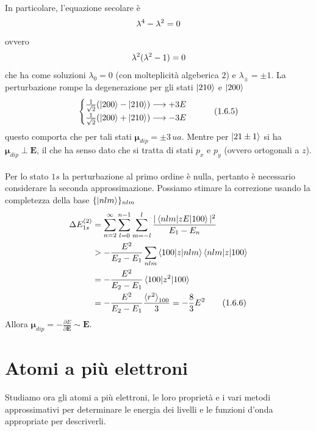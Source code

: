 \documentclass{article}
\begin{document}
In particolare, l'equazione secolare è
\begin{align}
    \lambda^4 - \lambda^2 = 0 \notag
\end{align}
ovvero 
\begin{align}
    \lambda^2(\lambda^2 - 1) = 0 \notag
\end{align}
che ha come soluzioni $\lambda_0 = 0$ (con molteplicità algeberica $2$) e $\lambda_{\pm} = \pm 1$. La perturbazione rompe la degenerazione per gli stati $\ket{210}$ e $\ket{200}$
\begin{align}
    \begin{cases}
        \frac{1}{\sqrt{2}}(\ket{200} - \ket{210}) \longrightarrow +3E \\
        \frac{1}{\sqrt{2}}(\ket{200} + \ket{210}) \longrightarrow -3E 
    \end{cases} \tag{1.6.5}
\end{align}
questo comporta che per tali stati $\boldsymbol{\mu}_{dip} = \pm 3 \, ua$. Mentre per $\ket{21\pm1}$ si ha $\boldsymbol{\mu}_{dip} \perp \mathbf{E}$, il che ha senso dato che si tratta di stati $p_x$ e $p_y$ (ovvero ortogonali a $z$). \\ \\
Per lo stato $1s$ la perturbazione al primo ordine è nulla, pertanto è necessario considerare la seconda approssimazione. Possiamo stimare la correzione usando la completezza della base $\{\ket{nlm}\}_{nlm}$
\begin{align}
    \Delta E^{(2)}_{1s} &= \sum_{n = 2}^\infty \sum_{l = 0}^{n - 1}\sum_{m = -l}^l \frac{|\braket{nlm|zE|100}|^2}{E_1 - E_n} \notag \\
    &> -\frac{E^2}{E_2 - E_1}\sum_{nlm} \braket{100|z|nlm}\braket{nlm|z|100} \notag \\
    &= -\frac{E^2}{E_2 - E_1}\braket{100|z^2|100} \notag \\
    &= -\frac{E^2}{E_2 - E_1}\frac{\braket{r^2}_{100}}{3} = -\frac{8}{3}E^2 \tag{1.6.6}
\end{align}
Allora $\boldsymbol{\mu}_{dip} = -\frac{\partial E}{\partial \mathbf{E}} \sim \mathbf{E}$.

\newpage
\section{Atomi a più elettroni}
Studiamo ora gli atomi a più elettroni, le loro proprietà e i vari metodi approssimativi per determinare le energia dei livelli e le funzioni d'onda appropriate per descriverli.
\end{document}
